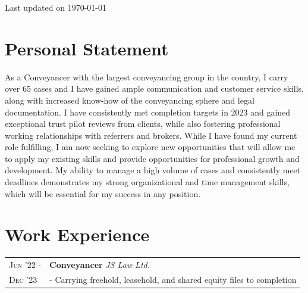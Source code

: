 \documentclass[a4paper,10pt]{extarticle} %
\begin{document}
\vspace{-0.6cm}
\hfill {\textcolor{secondary}{\scriptsize Last updated on \today}


\section{\textcolor{primary}{Personal Statement}}
\vspace{0.2cm}
As a Conveyancer with the largest conveyancing group in the country, I carry over 65 cases and I have gained ample communication and customer service skills, along with increased know-how of the conveyancing sphere and legal documentation. I have consistently met completion targets in 2023 and gained exceptional trust pilot reviews from clients, while also fostering professional working relationships with referrers and brokers. While I have found my current role fulfilling, I am now seeking to explore new opportunities that will allow me to apply my existing skills and  provide opportunities for professional growth and development. My ability to manage a high volume of cases and consistently meet deadlines demonstrates my strong organizational and time management skills, which will be essential for my success in any position. 
\\

\section{\textcolor{primary}{Work Experience}}

\begingroup %
\begin{tabularx}{\linewidth}{ l | X }



\textsc{Jun '22 -} & \textbf{Conveyancer} \hfill\textit{JS Law Ltd.}\\
\textsc{Dec '23}& {- Carrying freehold, leasehold, and shared equity files to completion}\\


\end{tabularx}}
\end{document}

